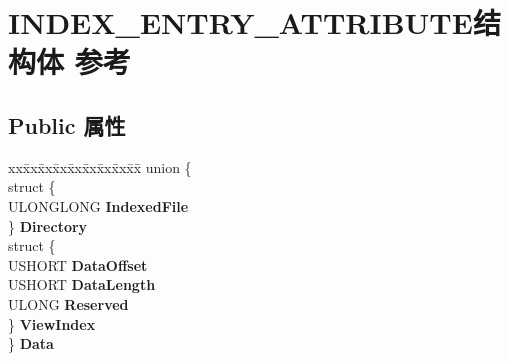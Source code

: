 \hypertarget{struct_i_n_d_e_x___e_n_t_r_y___a_t_t_r_i_b_u_t_e}{}\section{I\+N\+D\+E\+X\+\_\+\+E\+N\+T\+R\+Y\+\_\+\+A\+T\+T\+R\+I\+B\+U\+T\+E结构体 参考}
\label{struct_i_n_d_e_x___e_n_t_r_y___a_t_t_r_i_b_u_t_e}
\subsection*{Public 属性}
\begin{DoxyCompactItemize}
\item 
\mbox{\label{struct_i_n_d_e_x___e_n_t_r_y___a_t_t_r_i_b_u_t_e_a057063c51db5c270028f31e66d48d4e3}} 
\begin{tabbing}
xx\=xx\=xx\=xx\=xx\=xx\=xx\=xx\=xx\=\kill
union \{\\
\>struct \{\\
\>\>ULONGLONG {\bfseries IndexedFile}\\
\>\} {\bfseries Directory}\\
\>struct \{\\
\>\>USHORT {\bfseries DataOffset}\\
\>\>USHORT {\bfseries DataLength}\\
\>\>ULONG {\bfseries Reserved}\\
\>\} {\bfseries ViewIndex}\\
\} {\bfseries Data}\\


\end{tabbing}
\end{DoxyCompactItemize}
